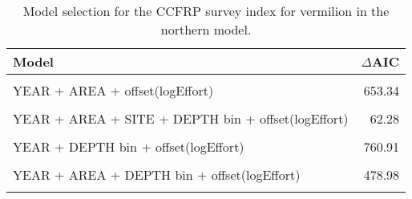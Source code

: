 \documentclass[
]{article}
\begin{document}
\begin{table}

\caption{\label{tab:tab-model-select-ccfrp}Model selection for the CCFRP survey index for vermilion in the northern model.}
\centering
\begin{tabular}[t]{lr}
\toprule
Model & $\Delta$AIC\\
\midrule
\cellcolor{gray!6}{1 + offset(logEffort)} & \cellcolor{gray!6}{1191.26}\\
YEAR + AREA + offset(logEffort) & 653.34\\
\cellcolor{gray!6}{YEAR + AREA + SITE + offset(logEffort)} & \cellcolor{gray!6}{188.88}\\
YEAR + AREA + SITE + DEPTH bin + offset(logEffort) & 62.28\\
\cellcolor{gray!6}{YEAR + SITE + offset(logEffort)} & \cellcolor{gray!6}{579.86}\\
\addlinespace
YEAR + DEPTH bin + offset(logEffort) & 760.91\\
\cellcolor{gray!6}{YEAR + SITE + DEPTH bin + offset(logEffort)} & \cellcolor{gray!6}{397.53}\\
YEAR + AREA + DEPTH bin + offset(logEffort) & 478.98\\
\cellcolor{gray!6}{YEAR + AREA + SITE + DEPTH bin + YEAR:SITE + offset(logEffort)} & \cellcolor{gray!6}{0.00}\\
\bottomrule
\end{tabular}
\end{table}

\FloatBarrier
\end{document}
